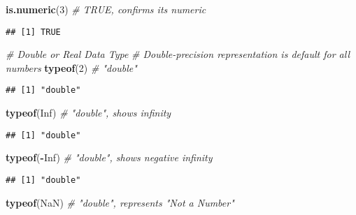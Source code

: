 \documentclass[
]{article}
\newenvironment{Shaded}{\begin{snugshade}}{\end{snugshade}}
\newcommand{\CommentTok}[1]{\textcolor[rgb]{0.56,0.35,0.01}{\textit{#1}}}
\newcommand{\ConstantTok}[1]{\textcolor[rgb]{0.56,0.35,0.01}{#1}}
\newcommand{\DecValTok}[1]{\textcolor[rgb]{0.00,0.00,0.81}{#1}}
\newcommand{\FunctionTok}[1]{\textcolor[rgb]{0.13,0.29,0.53}{\textbf{#1}}}
\newcommand{\NormalTok}[1]{#1}
\newcommand{\SpecialCharTok}[1]{\textcolor[rgb]{0.81,0.36,0.00}{\textbf{#1}}}
\begin{document}
\begin{Shaded}
\begin{Highlighting}[]
\FunctionTok{is.numeric}\NormalTok{(}\DecValTok{3}\NormalTok{)          }\CommentTok{\# TRUE, confirms it\textquotesingle{}s numeric}
\end{Highlighting}
\end{Shaded}

\begin{verbatim}
## [1] TRUE
\end{verbatim}

\begin{Shaded}
\begin{Highlighting}[]
\CommentTok{\# Double or Real Data Type}
\CommentTok{\# Double{-}precision representation is default for all numbers}
\FunctionTok{typeof}\NormalTok{(}\DecValTok{2}\NormalTok{)              }\CommentTok{\# "double"}
\end{Highlighting}
\end{Shaded}

\begin{verbatim}
## [1] "double"
\end{verbatim}

\begin{Shaded}
\begin{Highlighting}[]
\FunctionTok{typeof}\NormalTok{(}\ConstantTok{Inf}\NormalTok{)            }\CommentTok{\# "double", shows infinity}
\end{Highlighting}
\end{Shaded}

\begin{verbatim}
## [1] "double"
\end{verbatim}

\begin{Shaded}
\begin{Highlighting}[]
\FunctionTok{typeof}\NormalTok{(}\SpecialCharTok{{-}}\ConstantTok{Inf}\NormalTok{)           }\CommentTok{\# "double", shows negative infinity}
\end{Highlighting}
\end{Shaded}

\begin{verbatim}
## [1] "double"
\end{verbatim}

\begin{Shaded}
\begin{Highlighting}[]
\FunctionTok{typeof}\NormalTok{(}\ConstantTok{NaN}\NormalTok{)            }\CommentTok{\# "double", represents "Not a Number"}
\end{Highlighting}
\end{Shaded}
\end{document}

